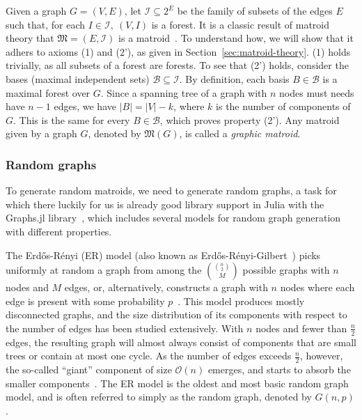Given a graph $G=(V,E)$, let $\mathcal{I} \subseteq 2^E$ be the family of subsets of the edges $E$ such that, for each $I \in \mathcal{I},\ (V, I)$ is a forest. It is a classic result of matroid theory that $\mathfrak{M} = (E, \mathcal{I})$ is a matroid~\cite[p.~657]{schrijver-2003}. To understand how, we will show that it adhers to axioms (1) and (2'), as given in Section~\ref{sec:matroid-theory}. (1) holds trivially, as all subsets of a forest are forests. To see that (2') holds, consider the bases (maximal independent sets) $\mathcal{B} \subseteq \mathcal{I}$. By definition, each basis $B \in \mathcal{B}$ is a maximal forest over $G$. Since a spanning tree of a graph with $n$ nodes must needs have $n-1$ edges, we have $|B| = |V| - k$, where $k$ is the number of components of $G$. This is the same for every $B \in \mathcal{B}$, which proves property (2'). Any matroid given by a graph $G$, denoted by $\mathfrak{M}(G)$, is called a \textit{graphic matroid}.

\subsubsection{Random graphs}
To generate random matroids, we need to generate random graphs, a task for which there luckily for us is already good library support in Julia with the Graphs.jl library~\cite{Graphs2021}, which includes several models for random graph generation with different properties.

The Erdős-Rényi (ER) model (also known as Erdős-Rényi-Gilbert~\cite{fienberg-2012}) picks uniformly at random a graph from among the $\binom{\binom{n}{2}}{M}$ possible graphs with $n$ nodes and $M$ edges, or, alternatively, constructs a graph with $n$ nodes where each edge is present with some probability $p$~\cite{erdos-1959, gilbert-1959}. This model produces mostly disconnected graphs, and the size distribution of its components with respect to the number of edges has been studied extensively. With $n$ nodes and fewer than $\frac{n}{2}$ edges, the resulting graph will almost always consist of components that are small trees or contain at most one cycle. As the number of edges exceeds $\frac{n}{2}$, however, the so-called ``giant'' component of size $\mathcal{O}(n)$ emerges, and starts to absorb the smaller components~\cite{janson1993birth}. The ER model is the oldest and most basic random graph model, and is often referred to simply as the random graph, denoted by $G(n,p)$.

